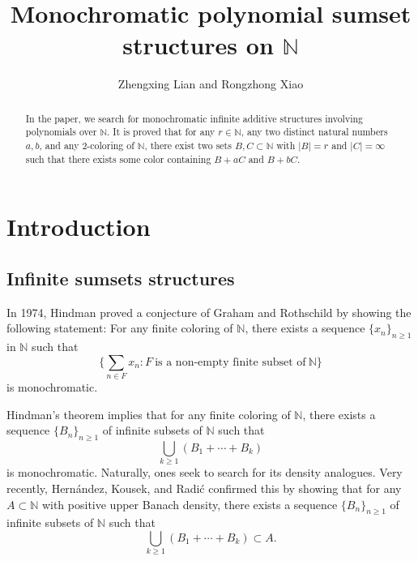 \documentclass[reqno,12pt]{amsart}
\def \N {\mathbb N}
\numberwithin{equation}{section}
\begin{document}
	
	
\title[]{Monochromatic polynomial sumset structures on $\N$}
	
	\author[]{Zhengxing Lian and Rongzhong Xiao}
	
	\address[Zhengxing Lian]{School of Mathematical Sciences, Xiamen University, Xiamen, Fujian, 361005, PR China}
	
	\address[Rongzhong Xiao]{School of Mathematical Sciences, University of Science and Technology of China, Hefei, Anhui, 230026, PR China}
	
	
	
\begin{abstract}
In the paper, we search for monochromatic infinite additive structures involving polynomials over $\N$. It is proved that for any $r\in \N$, any two distinct natural numbers $a,b$, and any $2$-coloring of $\N$, there exist two sets $B,C\subset \N$ with $|B|=r$ and $|C|=\infty$ such that there exists some color containing $B+aC$ and $B+bC$.
\end{abstract}

\maketitle

\section{Introduction}
\subsection{Infinite sumsets structures}
In 1974, Hindman \cite{H74} proved a conjecture of Graham and Rothschild \cite{GrahamRothschild71} by showing the following statement: For any finite coloring of $\N$, there exists a sequence $\{x_n\}_{n\ge 1}$ in $\N$ such that $$\{\sum_{n\in F}x_{n}:F\ \text{is a non-empty finite subset of}\ \N\}$$ is monochromatic. 

Hindman's theorem implies that for any finite coloring of $\N$, there exists a sequence $\{B_n\}_{n\ge 1}$ of infinite subsets of $\N$ such that 
$$\bigcup_{k\ge 1}(B_1+\cdots+B_k)$$ is monochromatic. Naturally, ones seek to search for its density analogues. Very recently, Hern\'andez, Kousek, and Radi\'c \cite{HKR2025} confirmed this by showing that for any $A\subset \N$ with positive upper Banach density, there exists a sequence $\{B_n\}_{n\ge 1}$ of infinite subsets of $\N$ such that 
$$\bigcup_{k\ge 1}(B_1+\cdots+B_k)\subset A.$$
\end{document}
